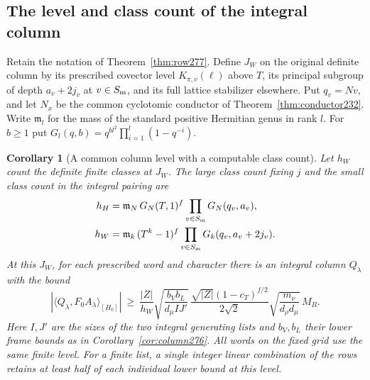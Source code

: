 \documentclass[a4paper,11pt]{article}
\newtheorem{corollary}[proposition]{Corollary}
\theoremstyle{definition}
\theoremstyle{remark}
\numberwithin{equation}{section}
\begin{document}
\subsection{The level and class count of the integral column}\label{nav:II-57}
Retain the notation of Theorem~\ref{thm:row277}. Define \(J_W\)
on the original definite column by its prescribed covector
level \(K_{\pi,v}(\ell)\) above \(T\), its principal subgroup
of depth \(a_v+2j_v\) at \(v\in S_{\rm m}\), and its full
lattice stabilizer elsewhere. Put \(q_v=Nv\), and let \(N_x\)
be the common cyclotomic conductor of
Theorem~\ref{thm:conductor232}. Write \(\mathfrak m_l\) for
the mass of the standard positive Hermitian genus in rank \(l\).
For \(b\ge1\) put
\(G_l(q,b)=q^{b l^2}\prod_{i=1}^l(1-q^{-i})\).

\begin{corollary}[A common column level with a computable class count]\leavevmode
\label{cor:mass277}
Let \(h_W\) count the definite finite classes at \(J_W\).
The large class count fixing \(j\) and the small class count
in the integral pairing are
\begin{align*}
 h_H&=\mathfrak m_N\,G_N(T,1)^f
                  \prod_{v\in S_{\rm m}}G_N(q_v,a_v),\\
 h_W&=\mathfrak m_k\,(T^k-1)^f
                  \prod_{v\in S_{\rm m}}G_k(q_v,a_v+2j_v).
\end{align*}
At this \(J_W\), for each prescribed word and character there
is an integral column \(Q_\lambda\) with the bound
\[
  |\langle Q_\lambda,F_0 A_\lambda\rangle_{[H_0]}|
  \ \ge\ \frac{|Z|}{h_W}
       \sqrt{\frac{b_V b_L}{d_\mu I J'}}\,
       \frac{\sqrt{|Z|}(1-c_T)^{f/2}}{2\sqrt2}
       \sqrt{\frac{m_\nu}{d_\rho d_\mu}}\,M_B .
\]
Here \(I,J'\) are the sizes of the two integral generating
lists and \(b_V,b_L\) their lower frame bounds as in
Corollary~\ref{cor:column276}. All words on the fixed grid
use the same finite level. For a finite list, a single
integer linear combination of the rows retains at least
half of each individual lower bound at this level.
\end{corollary}
\end{document}
